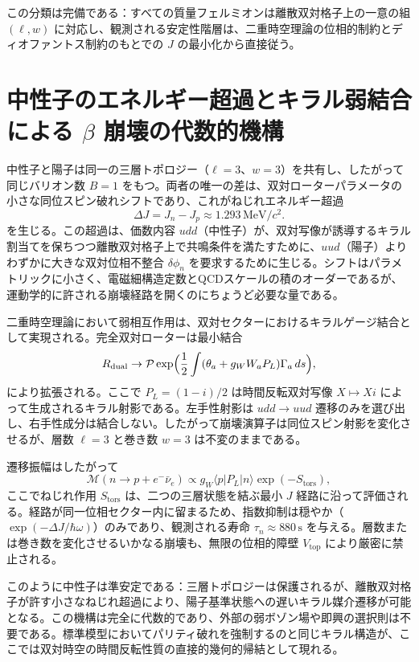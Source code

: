 \documentclass[a4paper]{article}
\begin{document}
この分類は完備である：すべての質量フェルミオンは離散双対格子上の一意の組 \((\ell,w)\) に対応し、観測される安定性階層は、二重時空理論の位相的制約とディオファントス制約のもとでの \(J\) の最小化から直接従う。

\section{中性子のエネルギー超過とキラル弱結合による \texorpdfstring{$\beta$}{beta} 崩壊の代数的機構}

中性子と陽子は同一の三層トポロジー（\(\ell=3\)、\(w=3\)）を共有し、したがって同じバリオン数 \(B=1\) をもつ。両者の唯一の差は、双対ローターパラメータの小さな同位スピン破れシフトであり、これがねじれエネルギー超過
\[
\Delta J = J_n - J_p \approx 1.293\,\mathrm{MeV}/c^2.
\]
を生じる。この超過は、価数内容 \(udd\)（中性子）が、双対写像が誘導するキラル割当てを保ちつつ離散双対格子上で共鳴条件を満たすために、\(uud\)（陽子）よりわずかに大きな双対位相不整合 \(\delta\phi_n\) を要求するために生じる。シフトはパラメトリックに小さく、電磁細構造定数とQCDスケールの積のオーダーであるが、運動学的に許される崩壊経路を開くのにちょうど必要な量である。

二重時空理論において弱相互作用は、双対セクターにおけるキラルゲージ結合として実現される。完全双対ローターは最小結合
\[
R_\text{dual} \to \mathcal{P}\exp\Bigl(\frac12\int(\theta_a + g_W W_a P_L)\Gamma_a\,ds\Bigr),
\]
により拡張される。ここで \(P_L = (1-i)/2\) は時間反転双対写像 \(X\mapsto Xi\) によって生成されるキラル射影である。左手性射影は \(udd\to uud\) 遷移のみを選び出し、右手性成分は結合しない。したがって崩壊演算子は同位スピン射影を変化させるが、層数 \(\ell=3\) と巻き数 \(w=3\) は不変のままである。

遷移振幅はしたがって
\[
\mathcal{M}(n\to p+e^-\bar\nu_e) \propto g_W \langle p | P_L | n \rangle \exp(-S_\text{tors}),
\]
ここでねじれ作用 \(S_\text{tors}\) は、二つの三層状態を結ぶ最小 \(J\) 経路に沿って評価される。経路が同一位相セクター内に留まるため、指数抑制は穏やか（\(\exp(-\Delta J/\hbar\omega)\)）のみであり、観測される寿命 \(\tau_n \approx 880\,\mathrm{s}\) を与える。層数または巻き数を変化させるいかなる崩壊も、無限の位相的障壁 \(V_\text{top}\) により厳密に禁止される。

このように中性子は準安定である：三層トポロジーは保護されるが、離散双対格子が許す小さなねじれ超過により、陽子基準状態への遅いキラル媒介遷移が可能となる。この機構は完全に代数的であり、外部の弱ボゾン場や即興の選択則は不要である。標準模型においてパリティ破れを強制するのと同じキラル構造が、ここでは双対時空の時間反転性質の直接的幾何的帰結として現れる。
\end{document}
